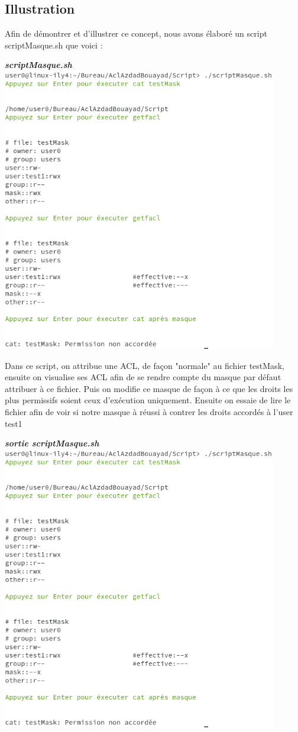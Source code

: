 \documentclass{article}
\begin{document}
\subsection{Illustration}
Afin de démontrer et d'illustrer ce concept, nous avons élaboré un script scriptMasque.sh que voici :
\begin{center}
    \textbf{\textit{scriptMasque.sh}}
\includegraphics[width=12cm]{images/scriptMasque.png}
\end{center}
Dans ce script, on attribue une ACL, de façon "normale" au fichier testMask, ensuite on visualise ses ACL afin de se rendre compte du masque par défaut attribuer à ce fichier. Puis on modifie ce masque de façon à ce que les droits les plus permissifs soient ceux d'exécution uniquement. Ensuite on essaie de lire le fichier afin de voir si notre masque à réussi à contrer les droits accordés à l'user test1
\newpage
\begin{center}
    \textbf{\textit{sortie scriptMasque.sh}}
\includegraphics[width=12cm]{images/sortieScriptMasque.png}
\end{center}
\end{document}
